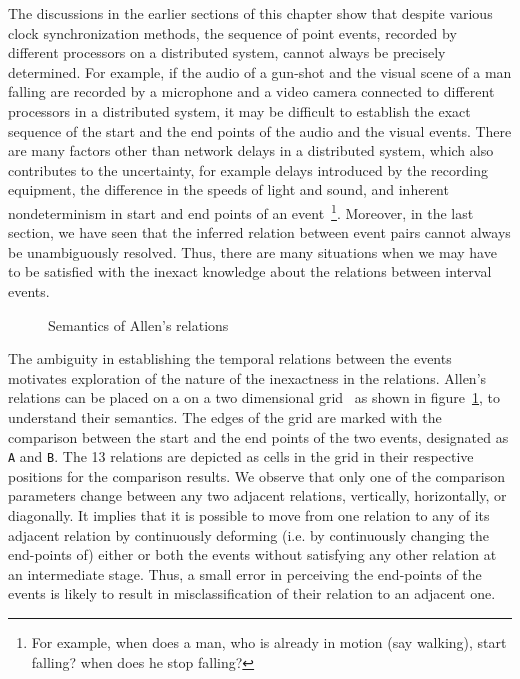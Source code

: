 The discussions in the earlier sections of this chapter show that despite various clock synchronization methods, the sequence of 
point events, recorded by different processors on a distributed system, cannot always be precisely determined. For example, if the 
audio of a gun-shot and the visual scene of a man falling are recorded by a microphone and a video camera connected to different 
processors in a distributed system, it may be difficult to establish the exact sequence of the start and the end points of the 
audio and the visual events. There are many factors other than network delays in a distributed system, which also contributes to 
the uncertainty, for example delays introduced by the recording equipment, the difference in the speeds of light and sound, 
and inherent nondeterminism in start and end points of an event~\footnote{For example, when does a man, who is already in motion 
(say walking), start falling? when does he stop falling?}. Moreover, in the last section, we have seen that the inferred relation 
between event pairs cannot always be unambiguously resolved. Thus, there are many situations when we may have to be satisfied with 
the inexact knowledge about the relations between interval events.

  
\begin{figure}[htbp!]
	\centerline{
	}
	\caption{Semantics of Allen's relations}
	\label{fig:clock:Allen-semantics}
\end{figure}
 
The ambiguity in establishing the temporal relations between the events motivates exploration of the nature of the inexactness
in the relations. Allen's relations can be placed on a on a two dimensional grid~\cite{Freska:1992} as shown in
figure~\ref{fig:clock:Allen-semantics}, to understand their semantics. The edges of the grid are marked with the comparison between 
the start and the end points of the two events, designated as \texttt{A} and \texttt{B}. The 13 relations are depicted as cells in 
the grid in their respective positions for the comparison results. We observe that only one of the comparison parameters change 
between any two adjacent relations, vertically, horizontally, or diagonally.
It implies that it is possible to move from one relation to any of its adjacent relation by continuously deforming (i.e. by 
continuously changing the end-points of) either or both the events without satisfying any other relation at an intermediate stage. 
Thus, a small error in perceiving the end-points of the events is likely to result in misclassification of their relation to 
an adjacent one.

